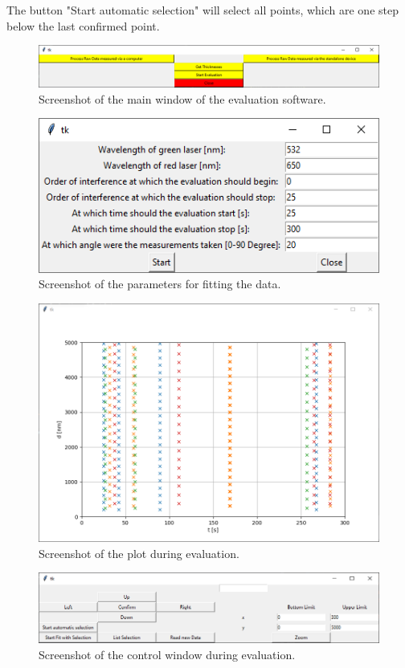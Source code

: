 The button "Start automatic selection" will select all points, which are one step below the last confirmed point. 


\begin{figure}
	\centering
	\includegraphics[width=0.7\linewidth]{LamellaDevice_Evaluation/Software}
	\caption{Screenshot of the main window of the evaluation software.}
	\label{fig:mainWindow_Evaluation}
\end{figure}

\begin{figure}
	\centering
	\includegraphics[width=0.7\linewidth]{LamellaDevice_Evaluation/Parameters}
	\caption{Screenshot of the parameters for fitting the data.}
	\label{fig:thickness_parameters}
\end{figure}

\begin{figure}
	\centering
	\includegraphics[width=0.7\linewidth]{LamellaDevice_Evaluation/Evaluation_Plot}
	\caption{Screenshot of the plot during evaluation.}
	\label{fig:evaluation_plot}
\end{figure}

\begin{figure}
	\centering
	\includegraphics[width=0.7\linewidth]{LamellaDevice_Evaluation/Evaluation_Control}
	\caption{Screenshot of the control window during evaluation.}
	\label{fig:evaluation_control}
\end{figure}

